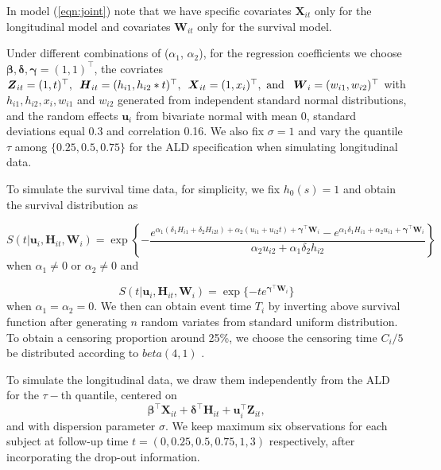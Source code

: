 \documentclass{article}
\begin{document}
In model (\ref{eqn:joint}) note that we have specific covariates ${\boldsymbol X}_{it}$ only for the longitudinal model and covariates ${\boldsymbol W}_{it}$ only for the survival model.


Under different combinations of ($\alpha_1$, $\alpha_2$), for the regression coefficients we choose $\boldsymbol{\beta, \delta, \gamma}=(1, 1)^{\top}$, the covriates ${\boldsymbol Z}_{it}=(1, t)^{\top},\hspace{0.5em} {\boldsymbol H}_{it}=(h_{i1}, h_{i2}*t)^{\top},\hspace{0.5em} {\boldsymbol X}_{it}=(1, x_i)^{\top},\mbox{ and }\hspace{0.5em} {\boldsymbol W}_{i}=(w_{i1}, w_{i2})^{\top}$ with $h_{i1}, h_{i2}, x_i, w_{i1}$ and $w_{i2}$ generated from independent standard normal distributions, and the random effects  $\boldsymbol{u}_i$ from bivariate normal with mean 0, standard deviations equal 0.3 and correlation 0.16. We also fix $\sigma=1$ and vary the quantile $\tau$ among $\{0.25, 0.5, 0.75\}$ for the ALD specification when simulating longitudinal data.

To simulate the survival time data, for simplicity, we fix $h_0(s)=1$ and obtain the survival distribution as 

\[S(t|\boldsymbol{u}_i, {\boldsymbol H}_{it}, {\boldsymbol W}_i)=\exp\left\{-\frac{e^{\alpha_1(\delta_1H_{i1}+\delta_2H_{i2t}) + \alpha_2(u_{i1}+u_{i2}t) + \boldsymbol{\gamma}^{\top}\boldsymbol{W}_i} - e^{\alpha_1\delta_1H_{i1}+\alpha_2u_{i1} + \boldsymbol{\gamma}^{\top}\boldsymbol{W}_i}}{\alpha_2u_{i2}+\alpha_1\delta_2h_{i2}}\right\}\] when $\alpha_1\ne0$ or $\alpha_2\ne0$ and 

\[S(t|\boldsymbol{u}_i, {\boldsymbol H}_{it}, {\boldsymbol W}_i) =  \exp\{-te^{\boldsymbol{\gamma}^{\top}\boldsymbol{W}_i}\}\]
when $\alpha_1=\alpha_2=0.$ We then can obtain event time $T_i$ by inverting above survival function after generating $n$ random variates from standard uniform distribution. To obtain a censoring proportion around 25\%, we choose the censoring time $C_i/5$ be distributed according to $beta(4,1)$ . \par

To simulate the longitudinal data, we draw them independently from the ALD for the $\tau-$th quantile, centered on 
\[\boldsymbol{\beta}^{\top}{\boldsymbol X}_{it} + \boldsymbol{\delta}^{\top}{\boldsymbol H}_{it} + {\boldsymbol u}_i^{\top}{\boldsymbol Z}_{it},\] and with dispersion parameter $\sigma$. We keep maximum six observations for each subject at follow-up time $t=(0, 0.25, 0.5, 0.75, 1, 3)$ respectively, after incorporating the drop-out information.
\end{document}
